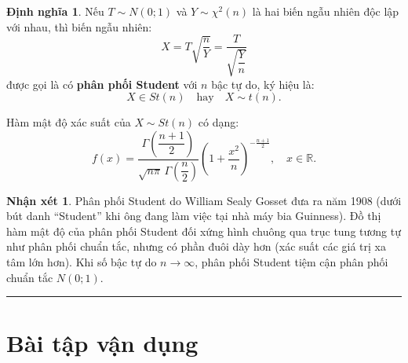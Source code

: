 \documentclass[12pt,a4paper]{article}
\theoremstyle{definition}
\newtheorem{dinhnghia}{Định nghĩa}[section]
\newtheorem{nhanxet}{Nhận xét}[section]
\begin{document}
\begin{dinhnghia}
Nếu $T \sim N(0; 1)$ và $Y \sim \chi^2(n)$ là hai biến ngẫu nhiên độc lập với nhau, thì biến ngẫu nhiên:
\[
X = T \sqrt{\frac{n}{Y}} = \frac{T}{\sqrt{\dfrac{Y}{n}}}
\]
được gọi là có \textbf{phân phối Student} với $n$ bậc tự do, ký hiệu là:
\[
X \in St(n) \quad \text{hay} \quad X \sim t(n).
\]

Hàm mật độ xác suất của $X \sim St(n)$ có dạng:
\[
f(x) = \frac{\Gamma\left(\dfrac{n + 1}{2}\right)}{\sqrt{n\pi} \, \Gamma\left(\dfrac{n}{2}\right)} \left(1 + \frac{x^2}{n}\right)^{-\frac{n + 1}{2}}, \quad x \in \mathbb{R}.
\]
\end{dinhnghia}

\begin{nhanxet}
Phân phối Student do William Sealy Gosset đưa ra năm 1908 (dưới bút danh ``Student'' khi ông đang làm việc tại nhà máy bia Guinness). Đồ thị hàm mật độ của phân phối Student đối xứng hình chuông qua trục tung tương tự như phân phối chuẩn tắc, nhưng có phần đuôi dày hơn (xác suất các giá trị xa tâm lớn hơn). Khi số bậc tự do $n \to \infty$, phân phối Student tiệm cận phân phối chuẩn tắc $N(0; 1)$.
\end{nhanxet}

\vspace{1.5em}
\hrule
\vspace{1.5em}

\section{Bài tập vận dụng}
\end{document}

